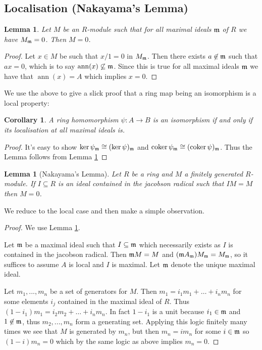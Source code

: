 \documentclass[12pt]{article}
\theoremstyle{plain}
\newtheorem{lemma}[thm]{Lemma}
\newtheorem{cor}[thm]{Corollary}
\theoremstyle{definition}
\newcommand{\lto}{\longrightarrow}
\begin{document}
	\subsection{Localisation (Nakayama's Lemma)}
	\begin{lemma}
		\label{lem:localistation_zero}
		Let $M$ be an $R$-module such that for all maximal ideals $\frak{m}$ of $R$ we have $M_\frak{m} = 0$. Then $M = 0$.
	\end{lemma}
	\begin{proof}
		Let $x \in M$ be such that $x/1 = 0$ in $M_\frak{m}$. Then there exists $a \not\in \frak{m}$ such that $ax = 0$, which is to say $\operatorname{ann}(x) \not\subseteq \frak{m}$. Since this is true for all maximal ideals $\frak{m}$ we have that $\operatorname{ann}(x) = A$ which implies $x = 0$.
	\end{proof}
	We use the above to give a slick proof that a ring map being an isomorphism is a local property:
	\begin{cor}
		\label{cor:isomorphism_is_local}
		A ring homomorphism $\psi: A \lto B$ is an isomorphism if and only if its localisation at all maximal ideals is.
	\end{cor}
	\begin{proof}
		It's easy to show $\ker \psi_{\frak{m}} \cong (\ker \psi)_{\frak{m}}$ and $\operatorname{coker} \psi_{\frak{m}} \cong (\operatorname{coker} \psi)_{\frak{m}}$. Thus the Lemma follows from Lemma \ref{lem:localistation_zero}
	\end{proof}
	\begin{lemma}[Nakayama's Lemma]
		Let $R$ be a ring and $M$ a finitely generated $R$-module. If $I \subseteq R$ is an ideal contained in the jacobson radical such that $IM = M$ then $M = 0$.
	\end{lemma}
	We reduce to the local case and then make a simple observation.
	\begin{proof}
		We use Lemma \ref{lem:localistation_zero}.
		
		Let $\frak{m}$ be a maximal ideal such that $I \subseteq \frak{m}$ which necessarily exists as $I$ is contained in the jacobson radical. Then $\frak{m}M = M$ and $(\frak{m}A_{\frak{m}})M_{\frak{m}} = M_{\frak{m}}$, so it suffices to assume $A$ is local and $I$ is maximal. Let $\frak{m}$ denote the unique maximal ideal.
		
		Let $m_1,..., m_n$ be a set of generators for $M$. Then $m_1 = i_1m_1 + \hdots + i_nm_n$ for some elements $i_j$ contained in the maximal ideal of $R$. Thus $(1-i_1)m_1 = i_2m_2 + \hdots + i_nm_n$. In fact $1 - i_1$ is a unit because $i_1 \in \frak{m}$ and $1 \not\in \frak{m}$, thus $m_2,...,m_n$ form a generating set. Applying this logic finitely many times we see that $M$ is generated by $m_n$, but then $m_n = im_n$ for some $i \in \frak{m}$ so $(1 - i)m_n = 0$ which by the same logic as above implies $m_n = 0$.
	\end{proof}
\end{document}
